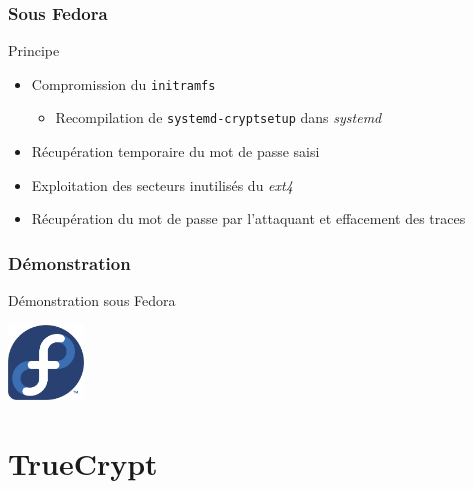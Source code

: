 \documentclass[red]{beamer}
\begin{document}
\begin{frame}
    \frametitle{Sous Fedora}
    \begin{block}{Principe}
        \begin{itemize}
            \item Compromission du \texttt{initramfs}
            \begin{itemize}
                \item Recompilation de \texttt{systemd-cryptsetup} dans \textit{systemd}
            \end{itemize}
            \item Récupération temporaire du mot de passe saisi
            \item Exploitation des secteurs inutilisés du \textit{ext4}
            \item Récupération du mot de passe par l'attaquant et effacement des traces
        \end{itemize}
    \end{block}

\end{frame}


\begin{frame}
    \frametitle{Démonstration}
    \centering
    Démonstration sous Fedora
    \vspace{0.5cm}
    
    \includegraphics[width=2cm]{img/fedora_logo.png}
\end{frame}

\section{TrueCrypt}
\end{document}
